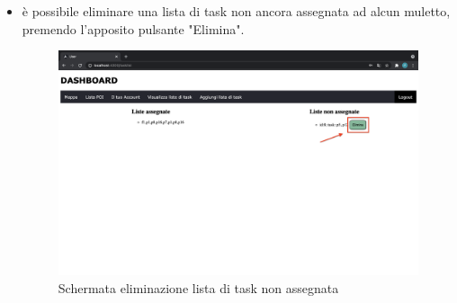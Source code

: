 \begin{itemize}
\begin{figure}[H]
    \end{figure}
    \item è possibile eliminare una lista di task non ancora assegnata ad alcun muletto, premendo l'apposito pulsante "Elimina".
    \begin{figure}[H]
        \centering
        \includegraphics[scale=0.2]{res/images/deletelist.png}
        \caption{Schermata eliminazione lista di task non assegnata}
    \end{figure}
\end{itemize}    

